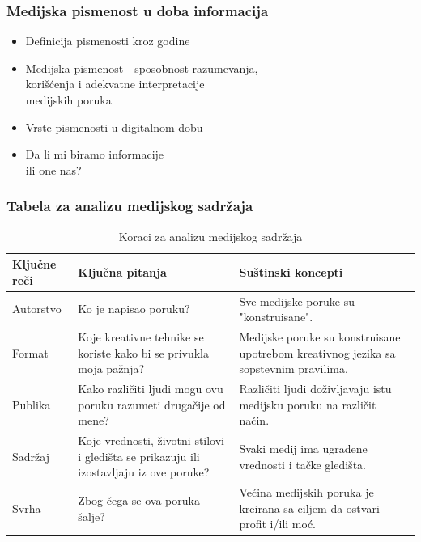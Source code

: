 \documentclass[13pt]{beamer}
\newcommand\Fontvi{\fontsize{8}{9.2}\selectfont}
\begin{document}
\begin{frame}[fragile]\frametitle{Medijska pismenost u doba informacija}
	\begin{itemize}	
		\item Definicija pismenosti kroz godine
		\item Medijska pismenost - sposobnost razumevanja,\\ korišćenja i adekvatne interpretacije\\ medijskih poruka
		\item Vrste pismenosti u digitalnom dobu
        \item Da li mi biramo informacije \\ili one nas?
	\end{itemize}

\end{frame}

\begin{frame}[fragile]\frametitle{Tabela za analizu medijskog sadržaja}
\Fontvi
\begin{table}[h!]
\begin{center}
\begin{tabular}{|m{1.5cm}|m{4cm}|m{4cm} |} \hline
Ključne reči& Ključna pitanja& Suštinski koncepti\\ \hline
Autorstvo&Ko je napisao poruku?&Sve medijske poruke su "konstruisane".\\ \hline
Format &Koje kreativne tehnike se koriste kako bi se privukla moja pažnja?&Medijske poruke su konstruisane upotrebom kreativnog jezika sa sopstevnim pravilima.\\ \hline
Publika &Kako različiti ljudi mogu ovu poruku razumeti drugačije od mene?&Različiti ljudi doživljavaju istu medijsku poruku na različit način.\\ \hline
Sadržaj &Koje vrednosti, životni stilovi i gledišta se prikazuju ili izostavljaju iz ove poruke?&Svaki medij ima ugrađene vrednosti i tačke gledišta.\\ \hline
Svrha &Zbog čega se ova poruka šalje?&Većina medijskih poruka je kreirana sa ciljem da ostvari profit i/ili moć.\\ \hline
\end{tabular}
\caption{Koraci za analizu medijskog sadržaja}
\label{tab:tabela2}
\end{center}
\end{table}
\end{frame}
\end{document}
